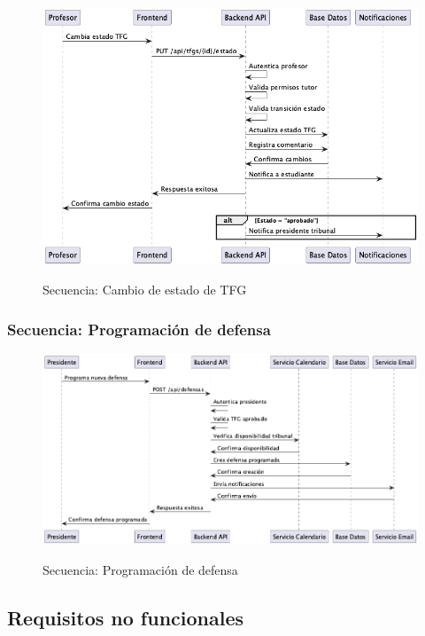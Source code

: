 \documentclass[12pt,a4paper,oneside]{report}
\providecommand{\pandocbounded}[1]{#1}
\begin{document}
\begin{figure}
\centering
\pandocbounded{\includegraphics[keepaspectratio,alt={Secuencia: Cambio de estado de TFG}]{processed/images/04_analisis_sistema_plantuml_2.png}}
\caption{Secuencia: Cambio de estado de TFG}
\end{figure}

\subsubsection{Secuencia: Programación de
defensa}\label{secuencia-programaciuxf3n-de-defensa}

\begin{figure}
\centering
\pandocbounded{\includegraphics[keepaspectratio,alt={Secuencia: Programación de defensa}]{processed/images/04_analisis_sistema_plantuml_3.png}}
\caption{Secuencia: Programación de defensa}
\end{figure}

\subsection{Requisitos no funcionales}\label{requisitos-no-funcionales}
\end{document}
